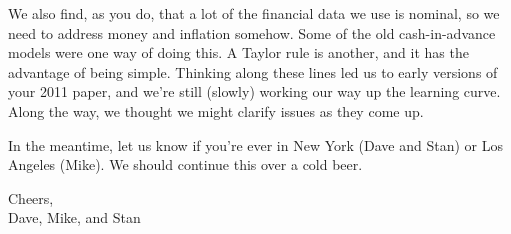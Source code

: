 \documentclass[12pt]{article}
\begin{document}
We also find, as you do, that a lot of the financial data we use is nominal,
so we need to address money and inflation somehow.
Some of the old cash-in-advance models were one way of doing this.
A Taylor rule is another, and it has the advantage of being simple.
Thinking along these lines led us to early versions of your 2011 paper,
and we're still (slowly) working our way up the learning curve.
Along the way, we thought we might clarify issues as they come up.


In the meantime, let us know if you're ever in New York (Dave and Stan)
or Los Angeles (Mike).
We should continue this over a cold beer.


Cheers, \\
Dave, Mike, and Stan
\end{document}
